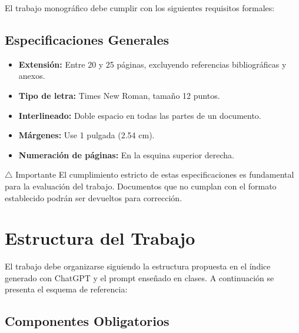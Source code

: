 \documentclass[12pt,a4paper]{article}
\begin{document}
El trabajo monográfico debe cumplir con los siguientes requisitos formales:

\subsection{Especificaciones Generales}

\begin{itemize}
  \item \textbf{Extensión:} Entre 20 y 25 páginas, excluyendo referencias bibliográficas y anexos.
  \item \textbf{Tipo de letra:} Times New Roman, tamaño 12 puntos.
  \item \textbf{Interlineado:} Doble espacio en todas las partes de un documento.
  \item \textbf{Márgenes:} Use 1 pulgada (2.54 cm).
  \item \textbf{Numeración de páginas:} En la esquina superior derecha.
\end{itemize}

\begin{warningbox}{$\triangle$ Importante}
  El cumplimiento estricto de estas especificaciones es fundamental para la evaluación del trabajo. Documentos que no cumplan con el formato establecido podrán ser devueltos para corrección.
\end{warningbox}

\section{Estructura del Trabajo}

El trabajo debe organizarse siguiendo la estructura propuesta en el índice generado con ChatGPT y el prompt enseñado en clases. A continuación se presenta el esquema de referencia:

\subsection{Componentes Obligatorios}
\end{document}

